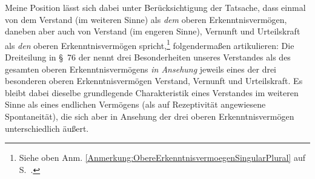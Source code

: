 \begin{comment}
Bevor \name[Immanuel]{Kant} auf die jeweiligen Besonderheiten in Bezug zu den
drei oberen Erkenntnisvermögen \emph{en detail} eingeht, macht er eine
Bemerkung, die sich auf alle drei Betrachtungen erstreckt:
\begin{quote}
Man wird bald inne, daß, wo der Verstand nicht folgen kann, die Vernunft
überschwänglich wird, und in zwar gegründeten Ideen (als regulativen
Prinzipien), aber nicht objektiv gültigen Begriffen sich hervortut; der Verstand
aber, der mit ihr nicht Schritt halten kann, aber doch zur Gültigkeit für
Objekte nötig sein würde, die Gültigkeit jener Ideen der Vernunft nur auf das
Subjekt, aber doch allgemein für alle von dieser Gattung, d.\.i. auf die
Bedingung einschränke, daß nach der Natur unseres (menschlichen)
Erkenntnisvermögens, oder gar überhaupt nach dem Begriffe, \ori{den wir uns} von
dem Vermögen eines endlichen Vernünftigen Wesens überhaupt \ori{machen} können,
nicht anders als so könne und müsse gedacht werden: ohne doch zu behaupten, daß
der Grund eines solchen Urteils im Objekt
liegt.\footnote{\cite[][\S~76]{Kant:KritikderUrteilskraft2009},
\cite[][V: 401.14--26]{Kant:GesammelteWerke1900ff.}.}
\end{quote}
Es gibt Begriffe und Urteile, die ihren Ursprung nicht in ihren Gegenständen
haben, sondern in dem erkennenden Subjekt, und die dennoch nicht beliebig sind.
Um zu zeigen, dass der Grund für solche Begriffe und Urteile nicht in ihren
Objekten liegt, muss \name[Immanuel]{Kant} einen denkbaren Vergleichsverstand
konzipieren, der sich von jedem endlichen qualitativ Verstand unterscheidet. Der
Grund liegt aber in einer Besonderheit unseres Verstandes, die ihn als
\emph{endlichen} Verstand notwendigerweise auszeichnet; handelte es sich um eine
zufällige Besonderheit, die wir empirisch bei uns feststellten, dann wäre es gar
kein hinreichend begründetes Urteil. Wäre ein Urteil so beschaffen, dass es für
jeden denkbaren Verstand zwingend wäre, dann müssten wir eingestehen, dass es
eine objektive Eigenschaft der Gegenstände und nicht eine notwendige subjektive
Beschaffenheit unseres Erkenntnisvermögens betrifft.
\end{comment}

Meine Position lässt sich dabei unter Berücksichtigung der Tatsache, dass
 einmal von dem Verstand (im weiteren Sinne) als \emph{dem}
oberen Erkenntnisvermögen, daneben aber auch von Verstand (im engeren Sinne),
Vernunft und Urteilskraft als \emph{den} oberen Erkenntnisvermögen
spricht,\footnote{Siehe oben Anm.
\ref{Anmerkung:ObereErkenntnisvermoegenSingularPlural} auf
S.~\pageref{Anmerkung:ObereErkenntnisvermoegenSingularPlural}.} folgendermaßen
artikulieren: Die Dreiteilung in \S~76 der  nennt
drei Besonderheiten unseres Verstandes als des gesamten oberen Erkenntnisvermögens
\emph{in Ansehung} jeweils eines der drei besonderen oberen Erkenntnisvermögen 
Verstand, Vernunft und Urteilskraft. Es bleibt dabei dieselbe grundlegende
Charakteristik eines Verstandes im weiteren Sinne als eines endlichen Vermögens
(als auf Rezeptivität angewiesene Spontaneität), die sich aber in Ansehung der
drei oberen Erkenntnisvermögen unterschiedlich äußert.

